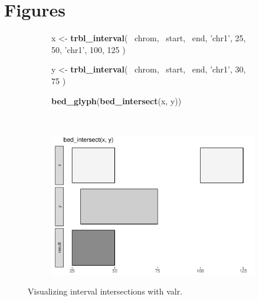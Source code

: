 \documentclass[9pt,a4paper]{extarticle}
\renewcommand{\KeywordTok}[1]{\textbf{{#1}}}
\renewcommand{\DecValTok}[1]{\textcolor[rgb]{0.00,0.00,1.00}{{#1}}}
\renewcommand{\StringTok}[1]{\textcolor[rgb]{0.87,0.00,0.00}{{#1}}}
\renewcommand{\NormalTok}[1]{{#1}}
\begin{document}
{\small
}

\section*{Figures}

\begin{figure}
\centering
    \begin{subfigure}[b]{0.45\textwidth}
\begin{Shaded}
\begin{Highlighting}[]
\NormalTok{x <-}\StringTok{ }\KeywordTok{trbl_interval}\NormalTok{(}
  \NormalTok{~chrom, ~start, ~end,}
  \StringTok{'chr1'}\NormalTok{, }\DecValTok{25}\NormalTok{,     }\DecValTok{50}\NormalTok{,}
  \StringTok{'chr1'}\NormalTok{, }\DecValTok{100}\NormalTok{,    }\DecValTok{125}
\NormalTok{)}

\NormalTok{y <-}\StringTok{ }\KeywordTok{trbl_interval}\NormalTok{(}
  \NormalTok{~chrom, ~start, ~end,}
  \StringTok{'chr1'}\NormalTok{, }\DecValTok{30}\NormalTok{,     }\DecValTok{75}
\NormalTok{)}

\KeywordTok{bed_glyph}\NormalTok{(}\KeywordTok{bed_intersect}\NormalTok{(x, y))}
\end{Highlighting}
\end{Shaded}
        \label{fig:bed_glyph_code}
    \end{subfigure}
    ~
\begin{subfigure}[b]{0.45\textwidth}
        \includegraphics[width=\textwidth]{intersect_glyph-1.pdf}
        \label{fig:bed_glyph_out}
    \end{subfigure}
\caption{\label{fig:your-figure}Visualizing interval intersections with valr.	 }
\end{figure}
\end{document}
